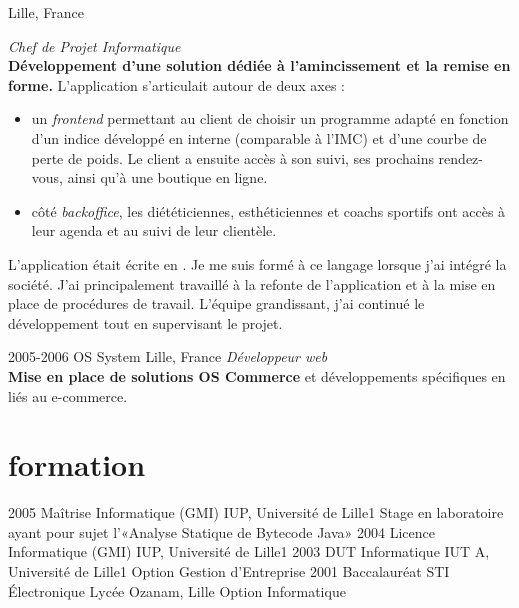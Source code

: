\documentclass[]{cv} %
\begin{document}
\begin{entrylist}
{Lille, France}
{\emph{Chef de Projet Informatique}
\vspace{5pt}\\
\textbf{Développement d'une solution dédiée à l'amincissement et la remise en forme.} L'application s'articulait autour de deux axes :
\begin{itemize}
\item un \emph{frontend} permettant au client de choisir un programme adapté en fonction d'un indice développé en interne (comparable à l'IMC) et d'une courbe de perte de poids. Le client a ensuite accès à son suivi, ses prochains rendez-vous, ainsi qu'à une boutique en ligne.
\item côté \emph{backoffice}, les diététiciennes, esthéticiennes et coachs sportifs ont accès à leur agenda et au suivi de leur clientèle. 
\end{itemize}
\vspace{5pt}
L'application était écrite en . Je me suis formé à ce langage lorsque j'ai intégré la société. J'ai principalement travaillé à la refonte de l'application et à la mise en place de procédures de travail. L'équipe grandissant, j'ai continué le développement tout en supervisant le projet.
}
\entry
{2005-2006}
{OS System}
{Lille, France}
{\emph{Développeur web}
\vspace{5pt}\\
\textbf{Mise en place de solutions OS Commerce} et développements spécifiques en  liés au e-commerce.}
\end{entrylist}

\par\vspace{5\parskip}
\section{formation}

\begin{entrylist}
\entry
{2005}
{Maîtrise {\normalfont Informatique (GMI)}}
{IUP, Université de Lille1}
{Stage en laboratoire ayant pour sujet l'«Analyse Statique de Bytecode Java»}
\entry
{2004}
{Licence {\normalfont Informatique (GMI)}}
{IUP, Université de Lille1}
{}
\entry
{2003}
{DUT {\normalfont Informatique}}
{IUT A, Université de Lille1}
{Option Gestion d'Entreprise}
\entry
{2001}
{Baccalauréat {\normalfont STI Électronique}}
{Lycée Ozanam, Lille}
{Option Informatique}
\end{entrylist}
\end{document}
